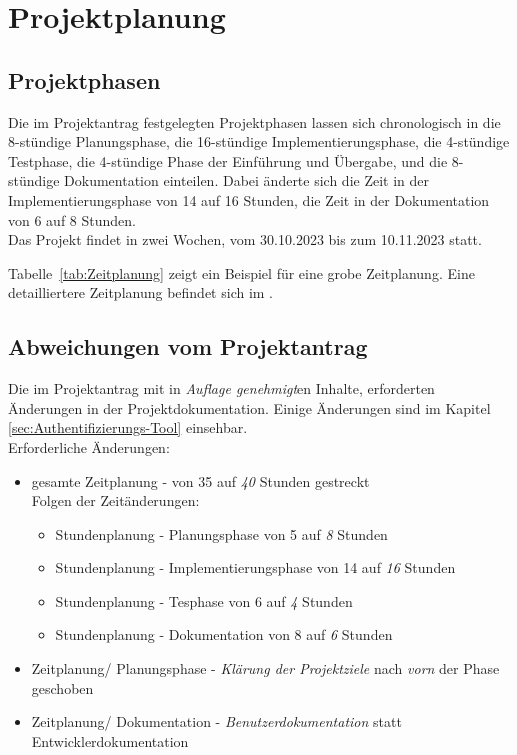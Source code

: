 \section{Projektplanung} 
\label{sec:Projektplanung}

\subsection{Projektphasen}
\label{sec:Projektphasen}
Die im Projektantrag festgelegten Projektphasen lassen sich chronologisch in die 8-stündige Planungsphase, 
die 16-stündige Implementierungsphase, die 4-stündige Testphase, die 4-stündige Phase der Einführung und Übergabe, 
und die 8-stündige Dokumentation einteilen.
Dabei änderte sich die Zeit in der Implementierungsphase von 14 auf 16 Stunden, die Zeit in der 
Dokumentation von 6 auf 8 Stunden.
\\Das Projekt findet in zwei Wochen, vom 30.10.2023 bis zum 10.11.2023 statt.

Tabelle~\ref{tab:Zeitplanung}  zeigt ein Beispiel für eine grobe Zeitplanung. 
Eine detailliertere Zeitplanung befindet sich im  .


\subsection{Abweichungen vom Projektantrag}
\label{sec:AbweichungenProjektantrag}
Die im Projektantrag mit in \textit{Auflage genehmigt}en Inhalte, erforderten Änderungen in der 
Projektdokumentation. Einige Änderungen sind im Kapitel \ref{sec:Authentifizierungs-Tool} 
 einsehbar. 
\\Erforderliche Änderungen:
\begin{itemize} [label=--]
	\item gesamte Zeitplanung - von 35 auf \textit{40} Stunden gestreckt
	\\Folgen der Zeitänderungen:
	\begin{itemize}
		\item Stundenplanung - Planungsphase von 5 auf \textit{8} Stunden
		\item Stundenplanung - Implementierungsphase von 14 auf \textit{16} Stunden
		\item Stundenplanung - Tesphase von 6 auf \textit{4} Stunden
		\item Stundenplanung - Dokumentation von 8 auf \textit{6} Stunden 
	\end{itemize}
	\item Zeitplanung/ Planungsphase - \textit{Klärung der Projektziele} nach \textit{vorn} der Phase geschoben
	\item Zeitplanung/ Dokumentation - \textit{Benutzerdokumentation} statt Entwicklerdokumentation
\end{itemize}

